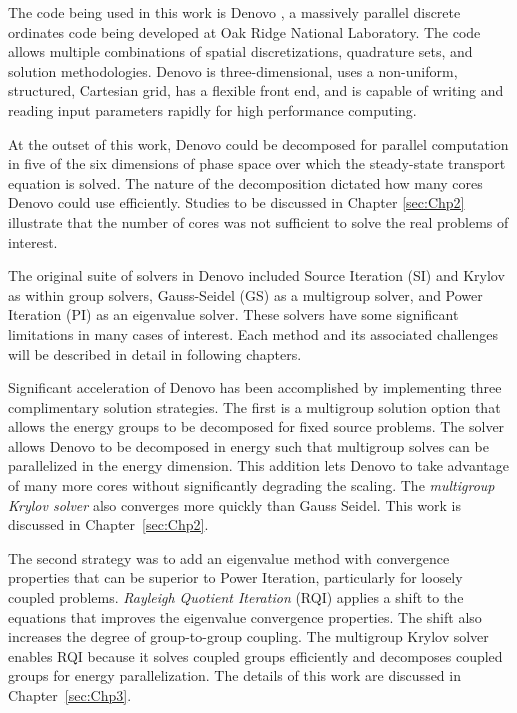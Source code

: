 The code being used in this work is Denovo \cite{Evans2009}, a massively parallel discrete ordinates code being developed at Oak Ridge National Laboratory. The code allows multiple combinations of spatial discretizations, quadrature sets, and solution methodologies. Denovo is three-dimensional, uses a non-uniform, structured, Cartesian grid, has a flexible front end, and is capable of writing and reading input parameters rapidly for high performance computing. 

At the outset of this work, Denovo could be decomposed for parallel computation in five of the six dimensions of phase space over which the steady-state transport equation is solved. The nature of the decomposition dictated how many cores Denovo could use efficiently. Studies to be discussed in Chapter \ref{sec:Chp2} illustrate that the number of cores was not sufficient to solve the real problems of interest. 

The original suite of solvers in Denovo included Source Iteration (SI) and Krylov as within group solvers, Gauss-Seidel (GS) as a multigroup solver, and Power Iteration (PI) as an eigenvalue solver. These solvers have some significant limitations in many cases of interest. Each method and its associated challenges will be described in detail in following chapters. 

Significant acceleration of Denovo has been accomplished by implementing three complimentary solution strategies. The first is a multigroup solution option that allows the energy groups to be decomposed for fixed source problems. The solver allows Denovo to be decomposed in energy such that multigroup solves can be parallelized in the energy dimension. This addition lets Denovo to take advantage of many more cores without significantly degrading the scaling. The \emph{multigroup Krylov solver} also converges more quickly than Gauss Seidel. This work is discussed in Chapter~\ref{sec:Chp2}.

The second strategy was to add an eigenvalue method with convergence properties that can be superior to Power Iteration, particularly for loosely coupled problems. \emph{Rayleigh Quotient Iteration} (RQI) applies a shift to the equations that improves the eigenvalue convergence properties. The shift also increases the degree of group-to-group coupling. The multigroup Krylov solver enables RQI because it solves coupled groups efficiently and decomposes coupled groups for energy parallelization. The details of this work are discussed in Chapter~\ref{sec:Chp3}.

